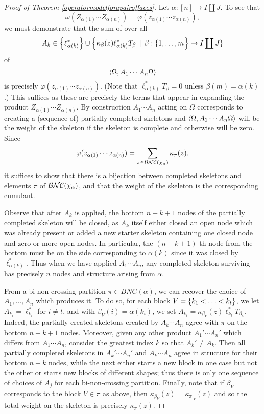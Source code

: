 \begin{proof}[Proof of Theorem \ref{operatormodelforapairoffaces}]
	Let $\alpha : [n] \to I \coprod J$.
	To see that
	\[
		\omega(Z_{\alpha(1)} \cdots Z_{\alpha(n)}) = \varphi(z_{\alpha(1)} \cdots z_{\alpha(n)}),
	\]
	we must demonstrate that the sum of over all
	\[
		A_{k} \in \left\{\ell_{\alpha(k)}^*\right\} \cup \left\{\kappa_\beta(z) \ell_{\alpha(k)}^*T_{\beta} \, \mid \, \beta : \{1,\ldots, m\right\} \to I \coprod J\}
	\]
	of
	\[
		\left\langle\Omega, A_1\cdots A_n\Omega\right\rangle
	\]
	is precisely $\varphi(z_{\alpha(1)} \cdots z_{\alpha(n)})$.
	(Note that $\ell_{\alpha(k)}^*T_\beta = 0$ unless $\beta(m) = \alpha(k)$.)
	This suffices as these are precisely the terms that appear in expanding the product $Z_{\alpha(1)}\cdots Z_{\alpha(n)}$.
	By construction $A_{1} \cdots A_{n}$ acting on $\Omega$ corresponds to creating a (sequence of) partially completed skeletons and $\left\langle\Omega, A_1\cdots A_n\Omega\right\rangle$ will be the weight of the skeleton if the skeleton is complete and otherwise will be zero.
	Since
	\[
		\varphi(z_{\alpha(1)} \cdots z_{\alpha(n)}) = \sum_{\pi \in \mathcal{BNC}(\chi_\alpha)}\kappa_{\pi}(z).
	\]
	it suffices to show that there is a bijection between completed skeletons and elements $\pi$ of $\mathcal{BNC}(\chi_\alpha)$, and that the weight of the skeleton is the corresponding cumulant.

	Observe that after $A_k$ is applied, the bottom $n-k+1$ nodes of the partially completed skeleton will be closed, as $A_k$ itself either closed an open node which was already present or added a new starter skeleton containing one closed node and zero or more open nodes.
	In particular, the $(n-k+1)$-th node from the bottom must be on the side corresponding to $\alpha(k)$ since it was closed by $\ell_{\alpha(k)}^*$.
	Thus when we have applied $A_1\cdots A_n$, any completed skeleton surviving has precisely $n$ nodes and structure arising from $\alpha$.

	From a bi-non-crossing partition $\pi \in BNC(\alpha)$, we can recover the choice of $A_1, \ldots, A_n$ which produces it.
	To do so, for each block $V = \left\{k_1 < \ldots < k_t\right\}$, we let $A_{k_i} = \ell_{k_i}^*$ for $i \neq t$, and with $\beta_V(i) = \alpha(k_i)$, we set $A_{k_t} = \kappa_{\beta_V}(z)\ell_{k_t}^*T_{\beta_V}$.
	Indeed, the partially created skeletons created by $A_k\cdots A_n$ agree with $\pi$ on the bottom $n-k+1$ nodes.
	Moreover, given any other product $A_1'\cdots A_n'$ which differs from $A_1\cdots A_n$, consider the greatest index $k$ so that $A_k'\neq A_k$.
	Then all partially completed skeletons in $A_k'\cdots A_n'$ and $A_k\cdots A_n$ agree in structure for their bottom $n-k$ nodes, while the next either starts a new block in one case but not the other or starts new blocks of different shapes; thus there is only one sequence of choices of $A_j$ for each bi-non-crossing partition.
	Finally, note that if $\beta_V$ corresponds to the block $V \in \pi$ as above, then $\kappa_{\beta_V}(z) = \kappa_{\pi|_V}(z)$ and so the total weight on the skeleton is precisely $\kappa_\pi(z)$.
\end{proof}


